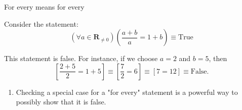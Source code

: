 \documentclass[portrait,fleqn,12pt]{beamer}
\newcommand{\reals}{\mathbf{R}}
\newenvironment{handlist}
   {\begin{enumerate}[\faHandPointRight]
       \addtolength{\itemsep}{0.0\itemsep}}
     {\end{enumerate}}
\begin{document}
\begin{frame}{For every means for every}

Consider the statement:
\begin{equation*}
  \left(\forall a \in \reals_{\neq 0} \right)\left(\frac{a+b}{a} = 1 + b \right) \equiv \text{True}
\end{equation*}

This statement is false. For instance, if we choose $a=2$ and $b=5$, then
\begin{equation*}
    \left[ \frac{2+5}{2} = 1+5 \right] \equiv   \left[ \frac{7}{2} = 6 \right]  \equiv \left[ 7 = 12\right]  \equiv \text{False}.
\end{equation*}

\begin{handlist}
\item Checking a special case for a "for every" statement is a powerful way to possibly show that it is false.
\end{handlist}

\end{frame}
\end{document}
